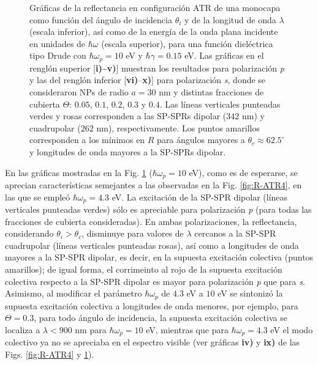 \begin{figure}[h!]
\vspace*{-.5em}
	\caption{Gráficas de la reflectancia en configuración ATR de una monocapa como función del ángulo de incidencia $\theta_i$ y de la longitud de onda $\lambda$ (escala inferior), así como de la energía de la onda plana incidente en unidades de $\hbar\omega$ (escala superior), para una función dieléctrica tipo Drude con $\hbar\omega_p=10$ eV  y  $\hbar\gamma=0. 15$ eV.  Las gráficas   en el renglón superior [\textbf{i)--v)}] muestran los resultados  para  polarización \emph{p} y las del renglón inferior  [\textbf{vi)}--\textbf{x)}] para polarización  \emph{s}, donde se consideraron NPs de radio $a=30$ nm y distintas fracciones de cubierta $\Theta$: $0. 05$, $0. 1$, $0. 2$, $0. 3$ y $0. 4$. Las líneas verticales punteadas verdes y rosas corresponden a las SP-SPRs dipolar ($342$ nm) y cuadrupolar ($262$ nm), respectivamente.  Los puntos amarillos corresponden a los mínimos en $R$ para ángulos mayores a $\theta_c\approx 62.5^\circ$ y longitudes de onda mayores a la SP-SPRs dipolar. }	\label{fig:R-ATR10}	
	\end{figure}		
	
En las gráficas mostradas en la Fig. \ref{fig:R-ATR10} ($\hbar\omega_p = 10$ eV), como es de esperarse, se aprecian características semejantes a las observadas en la Fig. \ref{fig:R-ATR4}, en las que se empleó $\hbar\omega_p = 4.3$ eV. La excitación de la SP-SPR dipolar (líneas verticales punteadas verdes) sólo es apreciable para polarización \emph{p} (para todas las fracciones de cubierta consideradas). En ambas polarizaciones, la reflectancia, considerando $\theta_i>\theta_c$, disminuye para valores de $\lambda$ cercanos a la SP-SPR cuadrupolar (líneas verticales punteadas rosas), así como a longitudes de onda mayores a la SP-SPR dipolar, es decir, en la supuesta excitación colectiva  (puntos amarillos); de igual forma, el corrimeinto al rojo de la supuesta excitación colectiva respecto a la SP-SPR dipolar es mayor para polarización \emph{p} que para \emph{s}.  Asimismo, al modificar el parámetro $\hbar\omega_p$ de $4.3$ eV a $10$ eV se sintonizó la supuesta excitación colectiva a longitudes de onda menores, por ejemplo, para $\Theta = 0.3$, para todo ángulo de incidencia, la supuesta excitación colectiva se localiza a $\lambda<900$ nm para $\hbar\omega_p=10$ eV, mientras que para $\hbar\omega_p=4.3$ eV el modo colectivo ya no se apreciaba en el espectro visible (ver gráficas \textbf{iv)} y \textbf{ix)} de las Figs. \ref{fig:R-ATR4} y \ref{fig:R-ATR10}).

